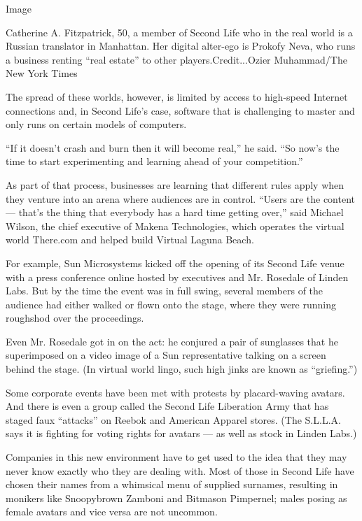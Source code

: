 Image

Catherine A. Fitzpatrick, 50, a member of Second Life who in the real
world is a Russian translator in Manhattan. Her digital alter-ego is
Prokofy Neva, who runs a business renting ``real estate'' to other
players.Credit...Ozier Muhammad/The New York Times

The spread of these worlds, however, is limited by access to high-speed
Internet connections and, in Second Life's case, software that is
challenging to master and only runs on certain models of computers.

``If it doesn't crash and burn then it will become real,'' he said. ``So
now's the time to start experimenting and learning ahead of your
competition.''

As part of that process, businesses are learning that different rules
apply when they venture into an arena where audiences are in control.
``Users are the content --- that's the thing that everybody has a hard
time getting over,'' said Michael Wilson, the chief executive of Makena
Technologies, which operates the virtual world There.com and helped
build Virtual Laguna Beach.

For example, Sun Microsystems kicked off the opening of its Second Life
venue with a press conference online hosted by executives and Mr.
Rosedale of Linden Labs. But by the time the event was in full swing,
several members of the audience had either walked or flown onto the
stage, where they were running roughshod over the proceedings.

Even Mr. Rosedale got in on the act: he conjured a pair of sunglasses
that he superimposed on a video image of a Sun representative talking on
a screen behind the stage. (In virtual world lingo, such high jinks are
known as ``griefing.'')

Some corporate events have been met with protests by placard-waving
avatars. And there is even a group called the Second Life Liberation
Army that has staged faux ``attacks'' on Reebok and American Apparel
stores. (The S.L.L.A. says it is fighting for voting rights for avatars
--- as well as stock in Linden Labs.)

Companies in this new environment have to get used to the idea that they
may never know exactly who they are dealing with. Most of those in
Second Life have chosen their names from a whimsical menu of supplied
surnames, resulting in monikers like Snoopybrown Zamboni and Bitmason
Pimpernel; males posing as female avatars and vice versa are not
uncommon.

